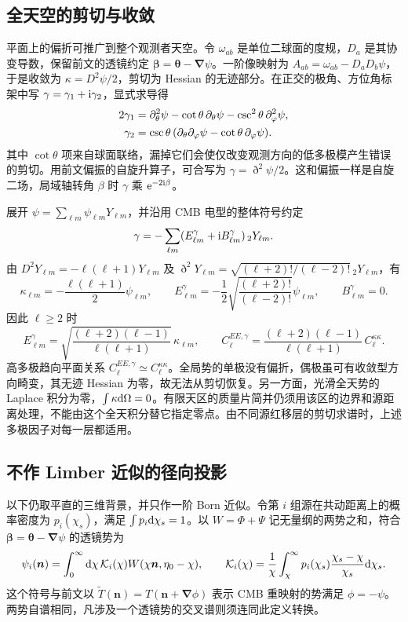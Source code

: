 \subsection{全天空的剪切与收敛}\label{sec:cosmo-lens-sphere}

平面上的偏折可推广到整个观测者天空。令 $\omega_{ab}$ 是单位二球面的度规，$D_a$ 是其协变导数，保留前文的透镜约定 $\bm\beta=\bm\theta-\bm\nabla\psi$。一阶像映射为 $A_{ab}=\omega_{ab}-D_aD_b\psi$，于是收敛为 $\kappa=D^2\psi/2$，剪切为 Hessian 的无迹部分。在正交的极角、方位角标架中写 $\gamma=\gamma_1+\mathrm{i}\gamma_2$，显式求导得
\[
 \begin{aligned}
 2\gamma_1&=\partial_\theta^2\psi-\cot\theta\,\partial_\theta\psi
                                  -\csc^2\theta\,\partial_\varphi^2\psi,\\
 \gamma_2&=\csc\theta\,
                    (\partial_\theta\partial_\varphi\psi-\cot\theta\,\partial_\varphi\psi).
 \end{aligned}
\]
其中 $\cot\theta$ 项来自球面联络，漏掉它们会使仅改变观测方向的低多极模产生错误的剪切。用前文偏振的自旋升算子，可合写为 $\gamma=\eth^2\psi/2$。这和偏振一样是自旋二场，局域轴转角 $\beta$ 时 $\gamma$ 乘 $\mathrm{e}^{-2\mathrm{i}\beta}$。

展开 $\psi=\sum_{\ell m}\psi_{\ell m}Y_{\ell m}$，并沿用 CMB 电型的整体符号约定
\[
 \gamma=-\sum_{\ell m}(E^\gamma_{\ell m}+\mathrm{i} B^\gamma_{\ell m})\,{}_2Y_{\ell m}.
\]
由 $D^2Y_{\ell m}=-\ell(\ell+1)Y_{\ell m}$ 及 $\eth^2Y_{\ell m}=\sqrt{(\ell+2)!/(\ell-2)!}\,{}_2Y_{\ell m}$，有
\[
 \kappa_{\ell m}=-\frac{\ell(\ell+1)}2\psi_{\ell m},\qquad
 E^\gamma_{\ell m}=-\frac12\sqrt{\frac{(\ell+2)!}{(\ell-2)!}}\psi_{\ell m},
 \qquad B^\gamma_{\ell m}=0 .
\]
因此 $\ell\ge2$ 时
\[
 E^\gamma_{\ell m}=
 \sqrt{\frac{(\ell+2)(\ell-1)}{\ell(\ell+1)}}\,\kappa_{\ell m},
 \qquad
 C_\ell^{EE,\gamma}=
 \frac{(\ell+2)(\ell-1)}{\ell(\ell+1)}\,C_\ell^{\kappa\kappa}.
\]
高多极趋向平面关系 $C_\ell^{EE,\gamma}\simeq C_\ell^{\kappa\kappa}$。全局势的单极没有偏折，偶极虽可有收敛型方向畸变，其无迹 Hessian 为零，故无法从剪切恢复。另一方面，光滑全天势的 Laplace 积分为零，$\int\kappa\dd\Omega=0$。有限天区的质量片简并仍须用该区的边界和源距离处理，不能由这个全天积分替它指定零点。由不同源红移层的剪切求谱时，上述多极因子对每一层都适用。

\subsection{不作 Limber 近似的径向投影}\label{sec:cosmo-lens-nonlimber}

以下仍取平直的三维背景，并只作一阶 Born 近似。令第 $i$ 组源在共动距离上的概率密度为 $p_i(\chi_s)$，满足 $\int p_i\dd\chi_s=1$。以 $W=\Phi+\Psi$ 记无量纲的两势之和，符合 $\bm\beta=\bm\theta-\bm\nabla\psi$ 的透镜势为
\[
 \psi_i(\bm n)=\int_0^\infty \dd\chi\,\mathcal K_i(\chi)
                     W(\chi\bm n,\eta_0-\chi),\qquad
 \mathcal K_i(\chi)=\frac1\chi\int_\chi^\infty
                p_i(\chi_s)\frac{\chi_s-\chi}{\chi_s}\dd\chi_s .
\]
这个符号与前文以 $\widetilde T(\bm n)=T(\bm n+\bm\nabla\phi)$ 表示 CMB 重映射的势满足 $\phi=-\psi$。两势自谱相同，凡涉及一个透镜势的交叉谱则须连同此定义转换。

